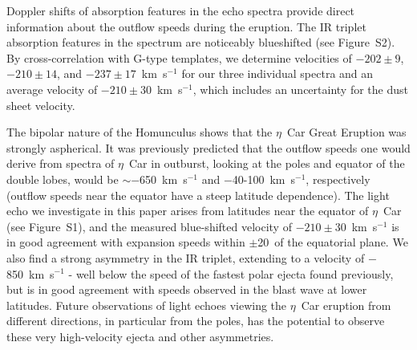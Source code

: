 Doppler shifts of absorption features in the echo spectra provide direct
information about the outflow speeds during the eruption.
The  IR triplet absorption features in the spectrum are
noticeably blueshifted (see Figure~S2).
\ifcheck
\fi
By cross-correlation with G-type\cite{Cenarro01} templates, we determine
velocities of $-202\pm9$, $-210\pm14$, and $-237\pm17$~km~s$^{-1}$ for
our three individual spectra and an average
velocity of $-210\pm30$~km~s$^{-1}$, which includes an uncertainty for
the dust sheet velocity.



The bipolar nature of the Homunculus shows that the $\eta$~Car
Great Eruption was strongly aspherical.  It was previously predicted
that the outflow speeds one would derive from spectra of $\eta$~Car in
outburst, looking at the poles and equator of the double lobes, would
be $\sim-$650~km~s$^{-1}$ and $-$40-100~km~s$^{-1}$,
respectively\cite{Smith06} (outflow speeds near the equator have a
steep latitude dependence). The light echo we investigate in this
paper arises from latitudes near the equator of $\eta$~Car (see Figure~S1),
\ifcheck
\fi
and the measured blue-shifted velocity of $-210\pm30$~km~s$^{-1}$ is
in good agreement with expansion speeds within $\pm$20\arcdeg\ of the
equatorial plane.  We also find a strong asymmetry in the
 IR triplet, extending to a velocity of
$-$850~km~s$^{-1}$ - well below the speed of the fastest polar
ejecta found previously\cite{Smith08}, but is in good agreement with
speeds observed in the blast wave at lower latitudes\cite{Smith08}.
Future observations of light echoes viewing the $\eta$~Car eruption
from different directions, in particular from the poles, has the
potential to observe these very high-velocity ejecta and other
asymmetries.





